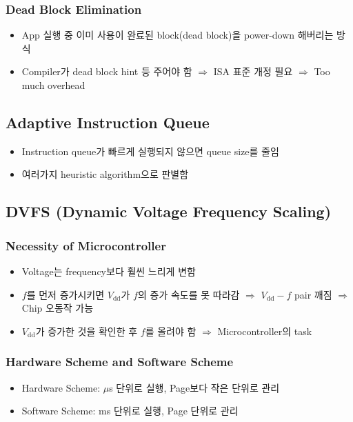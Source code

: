 \subsubsection*{Dead Block Elimination}
\begin{itemize}
    \item App 실행 중 이미 사용이 완료된 block(dead block)을 power-down 해버리는 방식
    \item Compiler가 dead block hint 등 주어야 함 $\Rightarrow$ ISA 표준 개정 필요 $\Rightarrow$ Too much overhead
\end{itemize}
\newpage

\subsection{Adaptive Instruction Queue}
\begin{itemize}
    \item Instruction queue가 빠르게 실행되지 않으면 queue size를 줄임
    \item 여러가지 heuristic algorithm으로 판별함
\end{itemize}

\subsection{DVFS (Dynamic Voltage Frequency Scaling)}

\subsubsection*{Necessity of Microcontroller}
\begin{itemize}
    \item Voltage는 frequency보다 훨씬 느리게 변함
    \item $f$를 먼저 증가시키면 $V_{\mathrm{dd}}$가 $f$의 증가 속도를 못 따라감
        $\Rightarrow$ $V_{\mathrm{dd}}-f$ pair 깨짐 $\Rightarrow$ Chip 오동작 가능
    \item $V_{\mathrm{dd}}$가 증가한 것을 확인한 후 $f$를 올려야 함 $\Rightarrow$ Microcontroller의 task
\end{itemize}

\subsubsection*{Hardware Scheme and Software Scheme}
\begin{itemize}
    \item Hardware Scheme: $\mu$s 단위로 실행, Page보다 작은 단위로 관리
    \item Software Scheme: ms 단위로 실행, Page 단위로 관리
\end{itemize}

